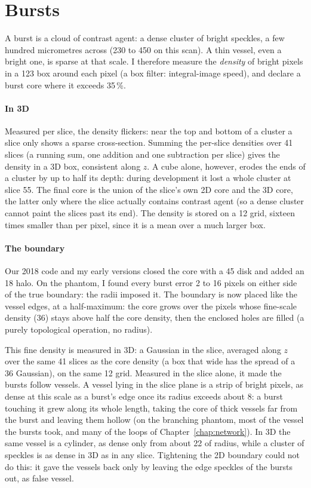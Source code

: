 \section{Bursts}
\label{sec:bursts}

A burst is a cloud of contrast agent: a dense cluster of bright speckles, a few hundred micrometres
across (230 to 450\um{} on this scan). A thin vessel, even a bright one, is sparse at that scale.
I therefore measure the \emph{density} of bright pixels in a 123\um{} box around each pixel
(a box filter: integral-image speed), and declare a burst core where it exceeds 35\,\%.

\paragraph{In 3D} Measured per slice, the density flickers: near the top and bottom of a cluster a
slice only shows a sparse cross-section. Summing the per-slice densities over 41 slices (a running sum,
one addition and one subtraction per slice) gives the density in a 3D box, consistent along $z$. A cube
alone, however, erodes the ends of a cluster by up to half its depth: during development it lost a
whole cluster at slice 55. The final core is the union of the slice's own 2D core and the 3D core,
the latter only where the slice actually contains contrast agent (so a dense cluster cannot paint the
slices past its end). The density is stored on a 12\um{} grid, sixteen times smaller than per pixel,
since it is a mean over a much larger box.

\paragraph{The boundary} Our 2018 code and my early versions closed the core with a 45\um{} disk and
added an 18\um{} halo. On the phantom, I found every burst error 2 to 16 pixels on either side of the true
boundary: the radii imposed it. The boundary is now placed like the vessel edges, at a half-maximum: the
core grows over the pixels whose fine-scale density (36\um) stays above half the core density, then the
enclosed holes are filled (a purely topological operation, no radius).

This fine density is measured in 3D: a Gaussian in the slice, averaged along $z$ over the same 41 slices
as the core density (a box that wide has the spread of a 36\um{} Gaussian), on the same 12\um{} grid.
Measured in the slice alone, it made the bursts follow vessels. A vessel lying in the slice plane is a
strip of bright pixels, as dense at this scale as a burst's edge once its radius exceeds about 8\um: a
burst touching it grew along its whole length, taking the core of thick vessels far from the burst and
leaving them hollow (on the branching phantom, most of the vessel the bursts took, and many of the loops
of Chapter~\ref{chap:network}). In 3D the same vessel is a cylinder, as dense only from about 22\um{}
of radius, while a cluster of speckles is as dense in 3D as in any slice. Tightening the 2D boundary
could not do this: it gave the vessels back only by leaving the edge speckles of the bursts out, as
false vessel.

